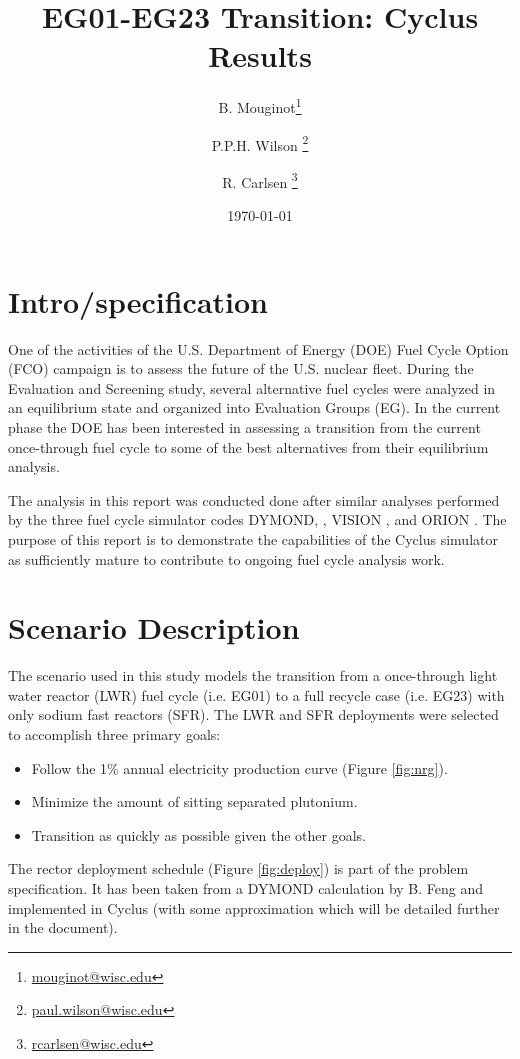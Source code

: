 \documentclass[12pt]{article}
\title{EG01-EG23 Transition: Cyclus Results}
\author[1]{B. Mouginot\thanks{\href{mailto:mouginot@wisc.edu}{mouginot@wisc.edu}}}
\author[1]{P.P.H. Wilson \thanks{\href{mailto:paul.wilson@wisc.edu}{paul.wilson@wisc.edu}}}
\author[1]{R. Carlsen \thanks{\href{mailto:rcarlsen@wisc.edu}{rcarlsen@wisc.edu}}}
\affil[1]{University of Wisconsin--Madison, Department of Engineering Physics, CNERG group}
\date{\today}
\begin{document}
\maketitle

\section{Intro/specification}

One of the activities of the U.S. Department of Energy (DOE) Fuel Cycle Option (FCO) campaign is
to assess the future of the U.S. nuclear fleet. During the Evaluation and Screening study, 
several alternative fuel cycles were analyzed in an equilibrium state and organized into Evaluation
Groups (EG).  In the current phase the DOE has been interested in assessing a transition from the
current once-through fuel cycle to some of the best alternatives from their
equilibrium analysis.

The analysis in this report was conducted done after similar analyses performed by the
three fuel cycle simulator codes DYMOND, \cite{dymon}, VISION \cite{vision},
and ORION \cite{orion}. The purpose of this report is to demonstrate the
capabilities of the Cyclus simulator \cite{cyclus} as sufficiently mature to
contribute to ongoing fuel cycle analysis work.

\section{Scenario Description}

The scenario used in this study models the transition from a once-through
light water reactor (LWR) fuel cycle (i.e. EG01) to a 
full recycle case (i.e. EG23) with only sodium fast reactors
(SFR).  The LWR and SFR deployments were
selected to accomplish three primary goals:

\begin{itemize}
    \item Follow the 1\% annual electricity production curve (Figure \ref{fig:nrg}).
    \item Minimize the amount of sitting separated plutonium.
    \item Transition as quickly as possible given the other goals.
\end{itemize}

The rector deployment schedule (Figure \ref{fig:deploy}) is part of the problem
specification. It has been taken from a DYMOND calculation by B. Feng\cite{B.Feng_calculation} 
and implemented in
Cyclus (with some approximation which will be detailed further in the
document).
\end{document}
